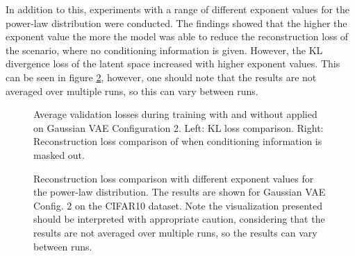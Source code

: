 In addition to this, experiments with a range of different exponent values for the power-law distribution were conducted. The findings showed that the higher the exponent value the more the model was able to reduce the reconstruction loss of the scenario, where no conditioning information is given. However, the KL divergence loss of the latent space increased with higher exponent values. This can be seen in figure \ref{fig:reconstruction_loss_vs_exponential_value_gaussian}, however, one should note that the results are not averaged over multiple runs, so this can vary between runs.


\begin{table}[H]
    \centering
    
    \caption{Cross-validation results of  applied to a Gaussian VAE(Config. 2) on the CelebA dataset.}
    \label{tab:results_method2_gaussian_vae}
\end{table}

\begin{figure}[H]
    \centering
    \scalebox{0.48}{}
    \scalebox{0.48}{}
    \caption[Validation loss during training with  applied on Gaussian VAE.]
    {
        Average validation losses during training with and without  applied on Gaussian VAE Configuration 2.
        Left: KL loss comparison. Right: Reconstruction loss comparison of when conditioning information is masked out.
    }
    \label{fig:results_method2_gaussian_vae}
\end{figure}

\begin{figure}[H]
    \centering
    \scalebox{0.48}{}
    \caption[Reconstruction loss comparison with different exponent values.]
    {
        Reconstruction loss comparison with different exponent values for the power-law distribution. The results are shown for Gaussian VAE Config. 2 on the CIFAR10 dataset. Note the visualization presented should be interpreted with appropriate caution, considering that the results are not averaged over multiple runs, so the results can vary between runs.
    }
    \label{fig:reconstruction_loss_vs_exponential_value_gaussian}
\end{figure}

